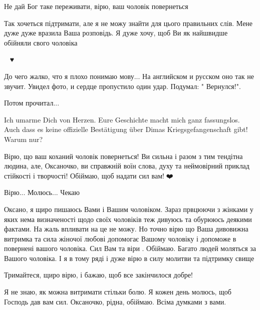 
Не дай Бог таке переживати, вірю, ваш чоловік повернеться 🙏


Так хочеться підтримати, але я не можу знайти для цього правильних слів. Мене
дуже дуже вразила Ваша розповідь. Я дуже хочу, щоб Ви як найшвидше обійняли
свого чоловіка


🙏🇺🇦♥️


До чего жалко, что я плохо понимаю мову... На английском и русском оно так не
звучит. Увидел фото, и сердце пропустило один удар. Подумал: " Вернулся!".

Потом прочитал...


Ich umarme Dich von Herzen. Eure Geschichte macht mich ganz fassungslos. Auch
dass es keine offizielle Bestätigung über Dimas Kriegsgefangenschaft gibt!
Warum nur?


Вірю, що ваш коханий чоловік повернеться! Ви сильна і разом з тим тендітна
людина, але, Оксаночко, ви справжній воїн слова, духу та неймовірний приклад
стійкості і творчості! Обіймаю, щоб надати сил вам!🙏❤️🌻🌞


Вірю... Молюсь... Чекаю


Оксано, я щиро пишаюсь Вами і Вашим чоловіком. Зараз првцюючи з жінками у яких
нема визначеності щодо своїх чоловіків теж дивуюсь та обурююсь деякими фактами.
На жаль впливати на це не можу. Но точно вірю що Ваша дивовижна витримка та
сила жіночої любові допомогає Вашому чоловіку і допоможе в повернені вашого
чоловіка. Сил Вам та віри . Обіймаю. Багато людей моляться за Вашого чоловіка.
І я в тому ряді і дуже вірю в силу молитви та підтримку свище


Тримайтеся, щиро вірю, і бажаю, щоб все закінчилося добре!


Я не знаю, як можна витримати стільки болю. Я кожен день молюсь, щоб Господь
дав вам сил. Оксаночко, рідна, обіймаю. Всіма думками з вами.


